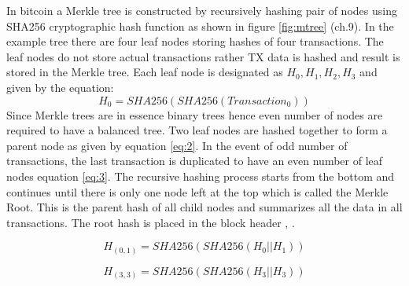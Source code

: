 In bitcoin a Merkle tree is constructed by recursively hashing pair of nodes using SHA256 cryptographic hash function as shown in figure \ref{fig:mtree} \cite{andy_mb} (ch.9).  In the example tree there are four leaf nodes storing hashes of four transactions. The leaf nodes do not store actual transactions rather TX data is hashed and result is stored in the Merkle tree. Each leaf node is designated as \( H_{0}, H_{1}, H_{2}, H_{3} \) and given by the equation: \[ H_{0} = SHA256(SHA256(Transaction_{0}))\]
Since Merkle trees are in essence binary trees hence even number of nodes are required to have a balanced tree. Two leaf nodes are hashed together to form a parent node as given by equation \eqref{eq:2}. In the event of odd number of transactions, the last transaction is duplicated to have an even number of leaf nodes equation \eqref{eq:3}. The recursive hashing process starts from the bottom and continues until there is only one node left at the top which is called the Merkle Root. This is the parent hash of all child nodes and summarizes all the data in all transactions. The root hash is placed in the block header \cite{cryptoeprint:2018:274}, \cite{paper:001}.

\begin{equation}
  \label{eq:2}
H_{(0,1)} = SHA256(SHA256(H_{0} || H_{1}))
\end{equation}

\begin{equation}
  \label{eq:3}
 H_{(3,3)} = SHA256(SHA256(H_{3} || H_{3}))
\end{equation}


\vspace{0.5cm}
